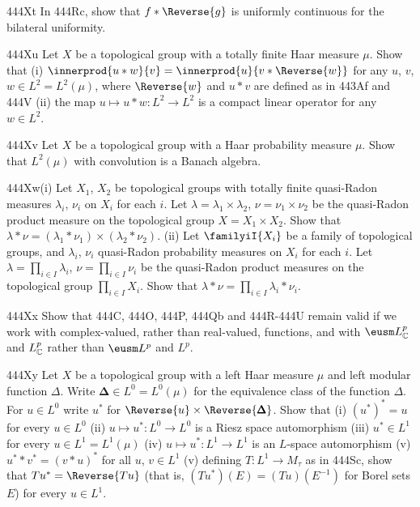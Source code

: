 {\spheader 444Xt In 444Rc, show that $f*\Reverse{g}$ is uniformly continuous
for the bilateral uniformity.   

\spheader 444Xu Let $X$ be a topological group with a totally finite
Haar measure $\mu$.   Show that (i)
$\innerprod{u*w}{v}=\innerprod{u}{v*\Reverse{w}}$ for any $u$, $v$,
$w\in L^2=L^2(\mu)$, where $\Reverse{w}$ and $u*v$ are defined as in 443Af
and 444V (ii) the map $u\mapsto u*w:L^2\to L^2$ is a compact linear
operator for any $w\in L^2$.   

\spheader 444Xv Let $X$ be a topological group with a Haar probability
measure $\mu$.   Show that $L^2(\mu)$ with convolution is a Banach
algebra.

\sqheader 444Xw(i) Let $X_1$, $X_2$ be topological groups with totally
finite quasi-Radon measures $\lambda_i$, $\nu_i$ on $X_i$ for each $i$.
Let $\lambda=\lambda_1\times\lambda_2$, $\nu=\nu_1\times\nu_2$ be the
quasi-Radon product measure on the topological group
$X=X_1\times X_2$.   Show that
$\lambda*\nu=(\lambda_1*\nu_1)\times(\lambda_2*\nu_2)$.
(ii) Let $\familyiI{X_i}$ be a family of topological groups, and
$\lambda_i$, $\nu_i$ quasi-Radon probability measures
on $X_i$ for each $i$.   Let $\lambda=\prod_{i\in I}\lambda_i$,
$\nu=\prod_{i\in I}\nu_i$ be the
quasi-Radon product measures on the topological group
$\prod_{i\in I}X_i$.   Show that
$\lambda*\nu=\prod_{i\in I}\lambda_i*\nu_i$.

\sqheader 444Xx Show that 444C, 444O, 444P, 444Qb and
444R-444U %
remain valid if we work with complex-valued, rather than real-valued,
functions, and with $\eusm L^p_{\Bbb C}$ and $L^p_{\Bbb C}$
rather than $\eusm L^p$ and $L^p$.

\spheader 444Xy Let $X$ be a topological group with a left
Haar measure $\mu$ and left modular function $\Delta$.   Write
$\pmb{\Delta}\in L^0=L^0(\mu)$ for the equivalence class of the function
$\Delta$.   For $u\in L^0$ write $u^*$ for
$\Reverse{u}\times\Reverse{\pmb{\Delta}}$.   Show that (i) $(u^*)^*=u$ for
every $u\in L^0$ (ii) $u\mapsto u^*:L^0\to L^0$ is a Riesz space
automorphism (iii) $u^*\in L^1$ for every
$u\in L^1=L^1(\mu)$ (iv) $u\mapsto u^*:L^1\to L^1$ is an $L$-space
automorphism (v) $u^**v^*=(v*u)^*$ for all $u$, $v\in L^1$ (v) defining
$T:L^1\to M_{\tau}$ as in 444Sc, show that $Tu^*=\Reverse{Tu}$
(that is, $(Tu^*)(E)=(Tu)(E^{-1})$ for Borel sets $E$) for every
$u\in L^1$.

}
